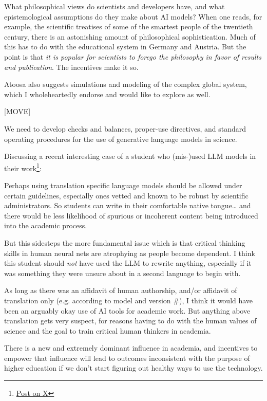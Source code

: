 \documentclass[11pt, oneside]{article}   	%
\begin{document}
What philosophical views do scientists and developers have, and what epistemological assumptions do they make about AI models?  When one reads, for example, the scientific treatises of some of the smartest people of the twentieth century, there is an astonishing amount of philosophical sophistication.  Much of this has to do with the educational system in Germany and Austria.  But the point is that \emph{it is popular for scientists to forego the philosophy in favor of results and publication}.  The incentives make it so.

Atoosa also suggests simulations and modeling of the complex global system, which I wholeheartedly endorse and would like to explore as well.  



[MOVE]

We need to develop checks and balances, proper-use directives, and standard operating procedures for the use of generative language models in science.

Discussing a recent interesting case of a student who (mis-)used LLM models in their work\footnote{\href{https://twitter.com/BeebsMemes/status/1759282741680443600}{Post on X}}:

Perhaps using translation specific language models should be allowed under certain guidelines, especially ones vetted and known to be robust by scientific administrators. So students can write in their comfortable native tongue… and there would be less likelihood of spurious or incoherent content being introduced into the academic process.

But this sidesteps the more fundamental  issue which is that critical thinking skills in human neural nets are atrophying as people become dependent.  I think this student should \emph{not} have used the LLM to rewrite anything, especially if it was something they were unsure about in a second language to begin with. 

As long as there was an affidavit of human authorship, and/or affidavit of translation only (e.g. according to model and version \#), I think it would have been an arguably okay use of AI tools for academic work. But anything above translation gets very suspect, for reasons having to do with the human values of science and the goal to train critical human thinkers in academia.

There is a new and extremely dominant influence in academia, and incentives to empower that influence will lead to outcomes inconsistent with the purpose of higher education if we don’t start figuring out healthy ways to use the technology.
\end{document}

